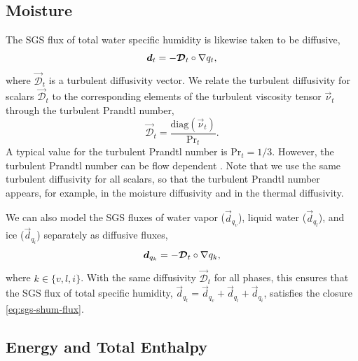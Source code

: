 \documentclass{report}
\begin{document}
\subsection{Moisture}

The SGS flux of total water specific humidity is likewise taken to be diffusive,
\begin{equation}\label{eq:sgs-shum-flux}
\boldsymbol{{d}}_{t} = - \boldsymbol{{\mathcal{D}}}_t \circ \nabla q_t,
\end{equation}
where $\vec{\mathcal{D}}_t$ is a turbulent diffusivity vector. We relate the turbulent diffusivity for scalars $\vec{\mathcal{D}}_t$ to the corresponding elements of the turbulent viscosity tensor $\vec{\nu}_t$ through the turbulent Prandtl number, 
\begin{equation}\label{e:Prandtl_number}
\vec{\mathcal{D}}_t = \frac{\mathrm{diag}(\vec{\nu}_t)}{\mathrm{Pr}_{t}}.
\end{equation} 
A typical value for the turbulent Prandtl number is $\mathrm{Pr}_{t} = 1/3$. However, the turbulent Prandtl number can be flow dependent \citep[e.g.,][]{Deardorff80a}. Note that we use the same turbulent diffusivity for all scalars, so that the turbulent Prandtl number appears, for example, in the moisture diffusivity and in the thermal diffusivity.

We can also model the SGS fluxes of water vapor ($\vec{d}_{q_v}$), liquid water ($\vec{d}_{q_l}$), and ice ($\vec{d}_{q_i}$) separately as diffusive fluxes, 
\begin{equation}\label{e:water_diffusion}
    \boldsymbol{{d}}_{q_k} = - \boldsymbol{{\mathcal{D}}}_t \circ \nabla q_k,
\end{equation}
where $k \in \{v, l, i\}$. With the same diffusivity $\vec{\mathcal{D}}_t$ for all phases, this ensures that the SGS flux of total specific humidity, $\vec{d}_{q_t} = \vec{d}_{q_v} + \vec{d}_{q_l} + \vec{d}_{q_i}$, satisfies the closure \eqref{eq:sgs-shum-flux}.

\subsection{Energy and Total Enthalpy}\label{s:energy_total_enthalpy}
\end{document}
